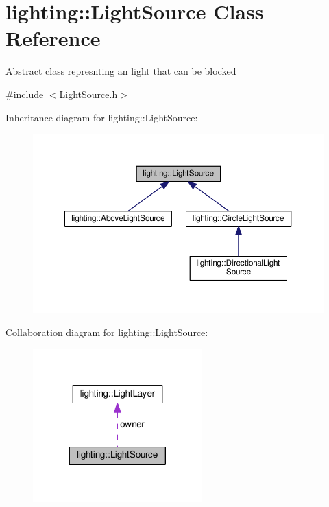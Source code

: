 \hypertarget{classlighting_1_1LightSource}{}\section{lighting\+:\+:Light\+Source Class Reference}
\label{classlighting_1_1LightSource}


Abstract class represnting an light that can be blocked  




{\ttfamily \#include $<$Light\+Source.\+h$>$}



Inheritance diagram for lighting\+:\+:Light\+Source\+:\nopagebreak
\begin{figure}[H]
\begin{center}
\leavevmode
\includegraphics[width=350pt]{classlighting_1_1LightSource__inherit__graph}
\end{center}
\end{figure}


Collaboration diagram for lighting\+:\+:Light\+Source\+:\nopagebreak
\begin{figure}[H]
\begin{center}
\leavevmode
\includegraphics[width=185pt]{classlighting_1_1LightSource__coll__graph}
\end{center}
\end{figure}
